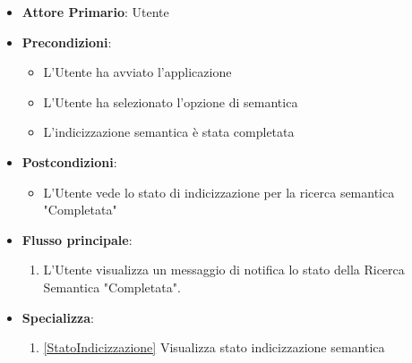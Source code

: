 \begin{itemize}
    \item \textbf{Attore Primario}: Utente
    \item \textbf{Precondizioni}:
    \begin{itemize}
      \item L'Utente ha avviato l'applicazione
      \item L'Utente ha selezionato l'opzione di  semantica
      \item L'indicizzazione semantica è stata completata
    \end{itemize}
    \item \textbf{Postcondizioni}:
    \begin{itemize}
        \item L'Utente vede lo stato di indicizzazione per la ricerca semantica "Completata"
    \end{itemize}
    \item \textbf{Flusso principale}:
    \begin{enumerate}
        \item L'Utente visualizza un messaggio di notifica lo stato della Ricerca Semantica "Completata".
    \end{enumerate}
    \item \textbf{Specializza}:
    \begin{enumerate}
              \item \ref{StatoIndicizzazione} Visualizza stato indicizzazione semantica
    \end{enumerate}
\end{itemize}

